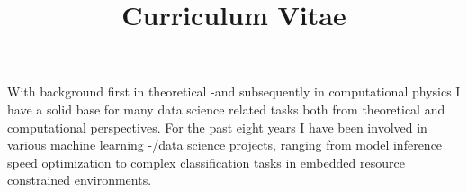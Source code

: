 \documentclass[10pt,a4paper,sans]{moderncv} %
\title{Curriculum Vitae}
\begin{document}

\iffalse
\clearpage

\recipient{Application for the position of XXX}{COMPANYt, to whom it may concern} %
\date{\today} %
\opening{} %
\closing{Best regards,} %

\makelettertitle %




{\bf Selected}
\begin{itemize}
	\item[-] Lead data scientist working with time series classification on embedded devices.
	\item[-] PhD in computational physics (2016). Master in theoretical physics (2012). Working in Dept. of Computer sciences since 2017-2022.
	\item[-] Very experienced in Python (\texttt{pandas, sklearn, numpy, scipy, sympy, pytorch, tensorflow, fastai,...}), Linux, \LaTeX, git, vim\dots %
	\item[-] Some experience in \texttt{c++}, machine vision, probability theory (Bayesian methods), information theory\dots
	\item[-] Highly motivated in work aligned with personal values and eager to learn new.
	\item[-] Social and easygoing father of two amazing daughters.
\end{itemize}






\makeletterclosing %

\newpage
\fi



\makecvtitle %



%
With background first in theoretical -and subsequently in computational physics I have a solid base for many data science related tasks both from theoretical and computational perspectives. For the past eight years I have been involved in various machine learning -/data science projects, ranging from model inference speed optimization to complex classification tasks in embedded resource constrained environments.
\end{document}

